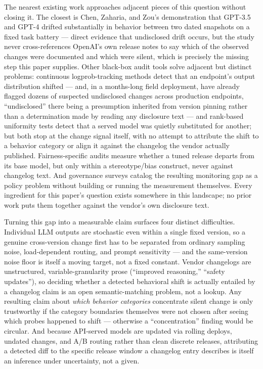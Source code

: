 \documentclass[11pt]{article}
\begin{document}
The nearest existing work approaches adjacent pieces of this question without closing it. The closest is Chen, Zaharia, and Zou's demonstration \citep{Chen2023ChatGPTBehavior} that GPT-3.5 and GPT-4 drifted substantially in behavior between two dated snapshots on a fixed task battery --- direct evidence that undisclosed drift occurs, but the study never cross-references OpenAI's own release notes to say which of the observed changes were documented and which were silent, which is precisely the missing step this paper supplies. Other black-box audit tools solve adjacent but distinct problems: continuous logprob-tracking methods \citep{LogProbTracking} detect that an endpoint's output distribution shifted --- and, in a months-long field deployment, have already flagged dozens of suspected undisclosed changes across production endpoints, ``undisclosed'' there being a presumption inherited from version pinning rather than a determination made by reading any disclosure text --- and rank-based uniformity tests \citep{RankUniformity} detect that a served model was quietly substituted for another; but both stop at the change signal itself, with no attempt to attribute the shift to a behavior category or align it against the changelog the vendor actually published. Fairness-specific audits \citep{BiasSimilarity} measure whether a tuned release departs from its base model, but only within a stereotype/bias construct, never against changelog text. And governance surveys \citep{TAIG} catalog the resulting monitoring gap as a policy problem without building or running the measurement themselves. Every ingredient for this paper's question exists somewhere in this landscape; no prior work puts them together against the vendor's own disclosure text.

Turning this gap into a measurable claim surfaces four distinct difficulties. Individual LLM outputs are stochastic even within a single fixed version, so a genuine cross-version change first has to be separated from ordinary sampling noise, load-dependent routing, and prompt sensitivity --- and the same-version noise floor is itself a moving target, not a fixed constant. Vendor changelogs are unstructured, variable-granularity prose (``improved reasoning,'' ``safety updates''), so deciding whether a detected behavioral shift is actually entailed by a changelog claim is an open semantic-matching problem, not a lookup. Any resulting claim about \emph{which behavior categories} concentrate silent change is only trustworthy if the category boundaries themselves were not chosen after seeing which probes happened to shift --- otherwise a ``concentration'' finding would be circular. And because API-served models are updated via rolling deploys, undated changes, and A/B routing rather than clean discrete releases, attributing a detected diff to the specific release window a changelog entry describes is itself an inference under uncertainty, not a given.
\end{document}
